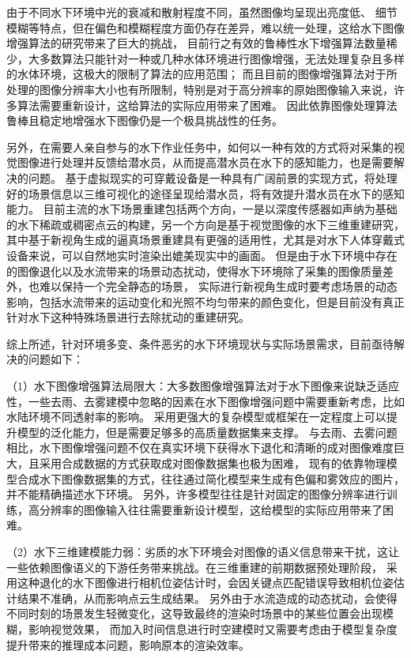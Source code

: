 由于不同水下环境中光的衰减和散射程度不同，虽然图像均呈现出亮度低、 细节模糊等特点，但在偏色和模糊程度方面仍存在差异，难以统一处理，这给水下图像增强算法的研究带来了巨大的挑战，
目前行之有效的鲁棒性水下增强算法数量稀少，大多数算法只能针对一种或几种水体环境进行图像增强，无法处理复杂且多样的水体环境，这极大的限制了算法的应用范围；
而且目前的图像增强算法对于所处理的图像分辨率大小也有所限制，特别是对于高分辨率的原始图像输入来说，许多算法需要重新设计，这给算法的实际应用带来了困难。
因此依靠图像处理算法鲁棒且稳定地增强水下图像仍是一个极具挑战性的任务。

另外，在需要人亲自参与的水下作业任务中，如何以一种有效的方式将对采集的视觉图像进行处理并反馈给潜水员，从而提高潜水员在水下的感知能力，也是需要解决的问题。\cite{underwater_perception}
基于虚拟现实的可穿戴设备是一种具有广阔前景的实现方式，将处理好的场景信息以三维可视化的途径呈现给潜水员，将有效提升潜水员在水下的感知能力。
目前主流的水下场景重建包括两个方向，一是以深度传感器如声纳为基础的水下稀疏或稠密点云的构建，另一个方向是基于视觉图像的水下三维重建研究，
其中基于新视角生成的逼真场景重建具有更强的适用性，尤其是对水下人体穿戴式设备来说，可以自然地实时渲染出媲美现实中的画面。
但是由于水下环境中存在的图像退化以及水流带来的场景动态扰动，使得水下环境除了采集的图像质量差外，也难以保持一个完全静态的场景，
实际进行新视角生成时要考虑场景的动态影响，包括水流带来的运动变化和光照不均匀带来的颜色变化，但是目前没有真正针对水下这种特殊场景进行去除扰动的重建研究。

综上所述，针对环境多变、条件恶劣的水下环境现状与实际场景需求，目前亟待解决的问题如下：

（1）水下图像增强算法局限大：大多数图像增强算法对于水下图像来说缺乏适应性，一些去雨、去雾建模中忽略的因素在水下图像增强问题中需要重新考虑，比如水陆环境不同透射率的影响。
采用更强大的复杂模型或框架在一定程度上可以提升模型的泛化能力，但是需要足够多的高质量数据集来支撑。
与去雨、去雾问题相比，水下图像增强问题不仅在真实环境下获得水下退化和清晰的成对图像难度巨大，且采用合成数据的方式获取成对图像数据集也极为困难，
现有的依靠物理模型合成水下图像数据集的方式，往往通过简化模型来生成有色偏和雾效应的图片，并不能精确描述水下环境。
另外，许多模型往往是针对固定的图像分辨率进行训练，高分辨率的图像输入往往需要重新设计模型，这给模型的实际应用带来了困难。

（2）水下三维建模能力弱：劣质的水下环境会对图像的语义信息带来干扰，这让一些依赖图像语义的下游任务带来挑战。在三维重建的前期数据预处理阶段，
采用这种退化的水下图像进行相机位姿估计时，会因关键点匹配错误导致相机位姿估计结果不准确，从而影响点云生成结果。
另外由于水流造成的动态扰动，会使得不同时刻的场景发生轻微变化，这导致最终的渲染时场景中的某些位置会出现模糊，影响视觉效果，
而加入时间信息进行时空建模时又需要考虑由于模型复杂度提升带来的推理成本问题，影响原本的渲染效率。

